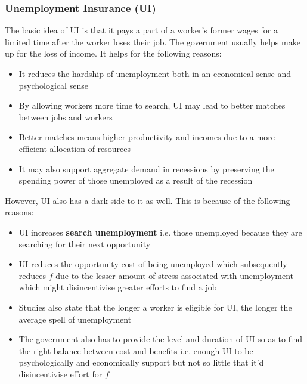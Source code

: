 \documentclass[12pt, letterpaper]{article}
\begin{document}
\subsubsection{Unemployment Insurance (UI)}
The basic idea of UI is that it pays a part of a worker's former wages for a limited time after the worker loses their job. The government usually helps make up for the loss of income. It helps for the following reasons:
\begin{itemize}
	\item It reduces the hardship of unemployment both in an economical sense and psychological sense
	\item By allowing workers more time to search, UI may lead to better matches between jobs and workers
	\item Better matches means higher productivity and incomes due to a more efficient allocation of resources
	\item It may also support aggregate demand in recessions by preserving the spending power of those unemployed as a result of the recession
\end{itemize}
However, UI also has a dark side to it as well. This is because of the following reasons:
\begin{itemize}
	\item UI increases \textbf{search unemployment} i.e. those unemployed because they are searching for their next opportunity
	\item UI reduces the opportunity cost of being unemployed which subsequently reduces $f$ due to the lesser amount of stress associated with unemployment which might disincentivise greater efforts to find a job
	\item Studies also state that the longer a worker is eligible for UI, the longer the average spell of unemployment
	\item The government also has to provide the level and duration of UI so as to find the right balance between cost and benefits i.e. enough UI to be psychologically and economically support but not so little that it'd disincentivise effort for $f$
\end{itemize}
\end{document}
